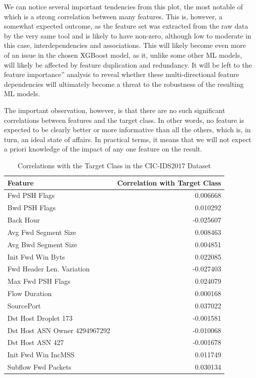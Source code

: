 We can notice several important tendencies from this plot, the most notable of which is a strong correlation between many features. This is, however, a somewhat expected outcome, as the feature set was extracted from the raw data by the very same tool and is likely to have non-zero, although low to moderate in this case, interdependencies and associations. This will likely become even more of an issue in the chosen XGBoost model, as it, unlike some other ML models, will likely be affected by feature duplication and redundancy. It will be left to the feature importance'' analysis to reveal whether these multi-directional feature dependencies will ultimately become a threat to the robustness of the resulting ML models.

The important observation, however, is that there are no such significant correlations between features and the target class. In other words, no feature is expected to be clearly better or more informative than all the others, which is, in turn, an ideal state of affairs. In practical terms, it means that we will not expect a priori knowledge of the impact of any one feature on the result.

\begin{table}[H] 
\centering 
\caption{Correlations with the Target Class in the CIC-IDS2017 Dataset}
\label{tab:dataset_correlations} 
\begin{tabular}{lr} 
\toprule 
Feature & Correlation with Target Class \\ 
\midrule 
Fwd PSH Flags & 0.006668 \\ 
Bwd PSH Flags & 0.010292 \\ 
Back Hour & -0.025607 \\ 
Avg Fwd Segment Size & 0.008463 \\ 
Avg Bwd Segment Size & 0.004851 \\ 
Init Fwd Win Byts & 0.022085 \\ 
Fwd Header Len. Variation & -0.027403 \\ 
Max Fwd PSH Flags & 0.024079 \\ 
Flow Duration & 0.000168 \\ 
SourcePort & 0.037022 \\ 
Dst Host Droplet 173 & -0.001581 \\ 
Dst Host ASN Owner 4294967292 & -0.010068 \\ 
Dst Host ASN 427 & -0.001678 \\ 
Init Fwd Win IncMSS & 0.011749 \\ 
Subflow Fwd Packets & 0.030134 \\ 
\bottomrule 
\end{tabular} 
\end{table} 

